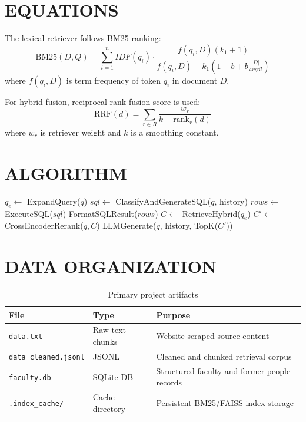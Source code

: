 \documentclass[12pt,a4paper]{report}
\begin{document}
\section{EQUATIONS}
The lexical retriever follows BM25 ranking:
\begin{equation}
\text{BM25}(D,Q)=\sum_{i=1}^{n} IDF(q_i) \cdot \frac{f(q_i,D)(k_1+1)}{f(q_i,D)+k_1\left(1-b+b\frac{|D|}{avgdl}\right)}
\end{equation}
where $f(q_i,D)$ is term frequency of token $q_i$ in document $D$.

For hybrid fusion, reciprocal rank fusion score is used:
\begin{equation}
\text{RRF}(d)=\sum_{r\in R}\frac{w_r}{k+\text{rank}_r(d)}
\end{equation}
where $w_r$ is retriever weight and $k$ is a smoothing constant.

\section{ALGORITHM}
\begin{algorithm}
\caption{Query Handling in Sahrdaya RAG X}
\begin{algorithmic}[1]
\State $q_e \gets$ ExpandQuery($q$)
\State $sql \gets$ ClassifyAndGenerateSQL($q$, history)
    \State $rows \gets$ ExecuteSQL($sql$)
        \State \Return FormatSQLResult($rows$)
    \EndIf
\EndIf
\State $C \gets$ RetrieveHybrid($q_e$) 
\State $C' \gets$ CrossEncoderRerank($q, C$)
\State \Return LLMGenerate($q$, history, TopK($C'$))
\EndProcedure
\end{algorithmic}
\end{algorithm}

\section{DATA ORGANIZATION}
\begin{table}[h!]
\centering
\caption{Primary project artifacts}
\begin{tabular}{|p{4cm}|p{4cm}|p{5.5cm}|}
\hline
\textbf{File} & \textbf{Type} & \textbf{Purpose} \\
\hline
\texttt{data.txt} & Raw text chunks & Website-scraped source content \\
\hline
\texttt{data\_cleaned.jsonl} & JSONL & Cleaned and chunked retrieval corpus \\
\hline
\texttt{faculty.db} & SQLite DB & Structured faculty and former-people records \\
\hline
\texttt{.index\_cache/} & Cache directory & Persistent BM25/FAISS index storage \\
\hline
\end{tabular}
\end{table}
\end{document}
